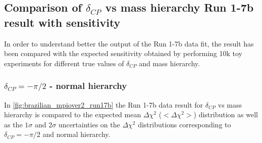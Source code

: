 
\clearpage





%
%

\subsection {Comparison of $\delta_{CP}$ vs mass hierarchy Run 1-7b result with sensitivity}
\label{sec:comparison_data_sensi_dcp_run17b}

In order to understand better the output of the Run 1-7b data fit, the result 
has been compared with the expected sensitivity obtained by performing 10k toy experiments
for different true values of $\delta_{CP}$ and mass hierarchy.

\subsubsection {$\delta_{CP} = -\pi/2$ - normal hierarchy}
\label{sec:dcp_mpiover2_nh_run17b}

In \cref{fig:brazilian_mpiover2_run17b} the Run 1-7b data result for $\delta_{CP}$ vs mass hierarchy 
is compared to the expected mean $\Delta \chi^2$ ($<\Delta \chi^2>$)
distribution as well as the $1\sigma$ and $2\sigma$ 
uncertainties on the $\Delta \chi^2$ distributions
corresponding to $\delta_{CP}=-\pi/2$ and normal hierarchy.

